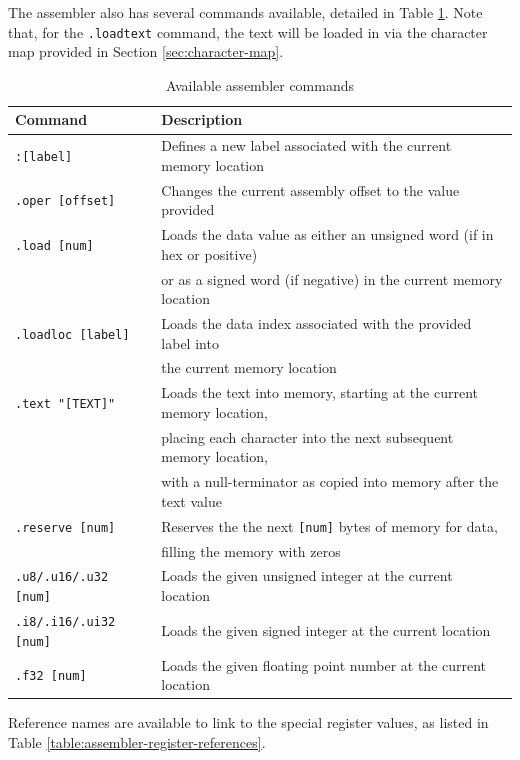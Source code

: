 \documentclass{article}
\begin{document}
The assembler also has several commands available, detailed in Table \ref{table:assembler-commands}. Note that, for the \texttt{.loadtext} command, the text will be loaded in via the character map provided in Section \ref{sec:character-map}.

\begin{table}[h!]
    \centering
    \begin{tabular}{l|l}
        \hline
        Command & Description \\
        \hline
        \texttt{:[label]} & Defines a new label associated with the current memory location \\
        \texttt{.oper [offset]} & Changes the current assembly offset to the value provided \\
        \texttt{.load [num]} & Loads the data value as either an unsigned word (if in hex or positive)\\
        & or as a signed word (if negative) in the current memory location \\
        \texttt{.loadloc [label]} & Loads the data index associated with the provided label into \\
        & the current memory location \\
        \texttt{.text "[TEXT]"} & Loads the text into memory, starting at the current memory location, \\
        & placing each character into the next subsequent memory location, \\
        & with a null-terminator as copied into memory after the text value \\
        \texttt{.reserve [num]} & Reserves the the next \texttt{[num]} bytes of memory for data, \\
        & filling the memory with zeros \\
        \hline
        \texttt{.u8/.u16/.u32 [num]} & Loads the given unsigned integer at the current location \\
        \texttt{.i8/.i16/.ui32 [num]} & Loads the given signed integer at the current location \\
        \texttt{.f32 [num]} & Loads the given floating point number at the current location \\
        \hline
    \end{tabular}
    \caption{Available assembler commands}
    \label{table:assembler-commands}
\end{table}

Reference names are available to link to the special register values, as listed in Table \ref{table:assembler-register-references}.
\end{document}
